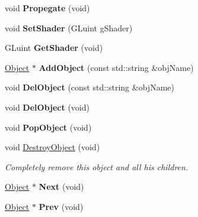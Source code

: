 \begin{DoxyCompactItemize}
\item 
\hypertarget{class_object_a8fb20a8c2ad30c7d39c5396121bd210e}{void {\bfseries Propegate} (void)}\label{class_object_a8fb20a8c2ad30c7d39c5396121bd210e}

\item 
\hypertarget{class_scene_a3010030e68d0468b8d18c1323e072e80}{void {\bfseries Set\-Shader} (G\-Luint g\-Shader)}\label{class_scene_a3010030e68d0468b8d18c1323e072e80}

\item 
\hypertarget{class_scene_a1debf8bc8a9cb168ebbbcda1b4ffd605}{G\-Luint {\bfseries Get\-Shader} (void)}\label{class_scene_a1debf8bc8a9cb168ebbbcda1b4ffd605}

\item 
\hypertarget{class_scene_a2a3a5e4f5ea44d086ff73f2420663a10}{\hyperlink{class_object}{Object} $\ast$ {\bfseries Add\-Object} (const std\-::string \&obj\-Name)}\label{class_scene_a2a3a5e4f5ea44d086ff73f2420663a10}

\item 
\hypertarget{class_scene_a3bd9fa1058f506c04162b9283e97d20e}{void {\bfseries Del\-Object} (const std\-::string \&obj\-Name)}\label{class_scene_a3bd9fa1058f506c04162b9283e97d20e}

\item 
\hypertarget{class_scene_a43fd3c56db5dc940d1724b9573c9a360}{void {\bfseries Del\-Object} (void)}\label{class_scene_a43fd3c56db5dc940d1724b9573c9a360}

\item 
\hypertarget{class_scene_abdfd15e7987aa261840d5ecc265170df}{void {\bfseries Pop\-Object} (void)}\label{class_scene_abdfd15e7987aa261840d5ecc265170df}

\item 
\hypertarget{class_scene_a82759ded1f6f87a91b8d10ed87501958}{void \hyperlink{class_scene_a82759ded1f6f87a91b8d10ed87501958}{Destroy\-Object} (void)}\label{class_scene_a82759ded1f6f87a91b8d10ed87501958}

\begin{DoxyCompactList}\small\item\em Completely remove this object and all his children. \end{DoxyCompactList}\item 
\hypertarget{class_scene_a0a57ee2c15864c55cf3284b937440330}{\hyperlink{class_object}{Object} $\ast$ {\bfseries Next} (void)}\label{class_scene_a0a57ee2c15864c55cf3284b937440330}

\item 
\hypertarget{class_scene_a955c5c984cc6bc5fb532752e43256211}{\hyperlink{class_object}{Object} $\ast$ {\bfseries Prev} (void)}\label{class_scene_a955c5c984cc6bc5fb532752e43256211}


\end{DoxyCompactItemize}
